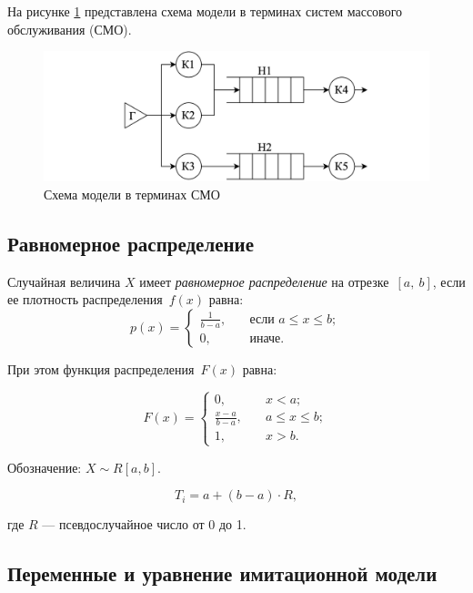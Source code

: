 На рисунке \ref{img:queuingSystems} представлена схема модели в терминах систем массового обслуживания (СМО).

\begin{figure}[ht!]
	\centering
	\includegraphics[width=0.6\linewidth]{../img/queuingSystems.png}
	\caption{Схема модели в терминах СМО}
	\label{img:queuingSystems}
\end{figure}

\subsection {Равномерное распределение}

Случайная величина $X$ имеет \textit{равномерное распределение} на отрезке~$[a,~b]$, если ее плотность распределения~$f(x)$ равна:
\begin{equation}
	p(x) =
	\begin{cases}
		\displaystyle\frac{1}{b - a}, & \quad \text{если } a \leq x \leq b;\\
		0,  & \quad \text{иначе}.
	\end{cases}
\end{equation}

При этом функция распределения~$F(x)$ равна:

\begin{equation}
	F(x) =
	\begin{cases}
		0,  & \quad x < a;\\
		\displaystyle\frac{x - a}{b - a}, & \quad a \leq x \leq b;\\
		1,  & \quad x > b.
	\end{cases}
\end{equation}

Обозначение: $X \sim R[a, b]$.

\begin{equation}
	T_{i} = a + (b - a) \cdot R,
\end{equation}

\noindent где $R$ --- псевдослучайное число от 0 до 1.

\subsection{Переменные и уравнение имитационной модели}

